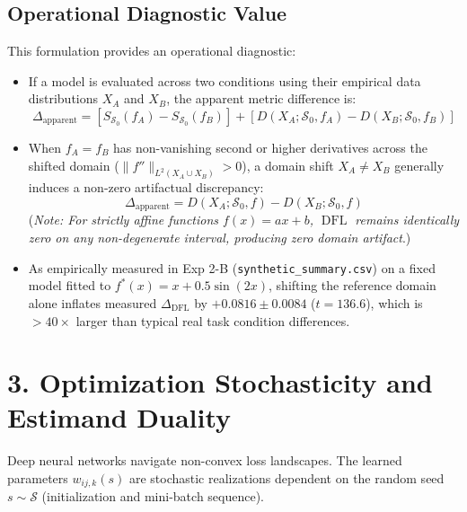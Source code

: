 \documentclass{article}
\begin{document}
\subsection*{Operational Diagnostic Value}
This formulation provides an operational diagnostic:
\begin{itemize}
    \item If a model is evaluated across two conditions using their empirical data distributions $X_A$ and $X_B$, the apparent metric difference is:
    \begin{equation}
    \Delta_{\mathrm{apparent}} = [S_{\mathcal{S}_0}(f_A) - S_{\mathcal{S}_0}(f_B)] + [D(X_A; \mathcal{S}_0, f_A) - D(X_B; \mathcal{S}_0, f_B)]
    \end{equation}
    \item When $f_A = f_B$ has non-vanishing second or higher derivatives across the shifted domain ($\|f''\|_{L^2(X_A \cup X_B)} > 0$), a domain shift $X_A \neq X_B$ generally induces a non-zero artifactual discrepancy:
    \begin{equation}
    \Delta_{\mathrm{apparent}} = D(X_A; \mathcal{S}_0, f) - D(X_B; \mathcal{S}_0, f)
    \end{equation}
    (\textit{Note: For strictly affine functions $f(x) = ax + b$, $\operatorname{DFL}$ remains identically zero on any non-degenerate interval, producing zero domain artifact}.)
    \item As empirically measured in Exp 2-B (\texttt{synthetic\_summary.csv}) on a fixed model fitted to $f^*(x) = x + 0.5\sin(2x)$, shifting the reference domain alone inflates measured $\Delta_{\mathrm{DFL}}$ by \textbf{$+0.0816 \pm 0.0084$} ($t = 136.6$), which is $>40\times$ larger than typical real task condition differences.
\end{itemize}

\section*{3. Optimization Stochasticity and Estimand Duality}

Deep neural networks navigate non-convex loss landscapes. The learned parameters $w_{ij,k}(s)$ are stochastic realizations dependent on the random seed $s \sim \mathcal{S}$ (initialization and mini-batch sequence).
\end{document}
